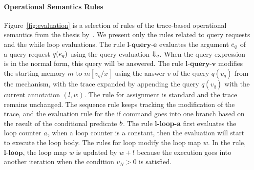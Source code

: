 \paragraph*{Operational Semantics Rules}
Figure~\ref{fig:evaluation} is a selection of rules of the trace-based operational semantics from {the thesis by~\cite{weihao22}}.
We present only the rules related to query requests and the while loop evaluations.
The rule $\textbf{l-query-e}$ evaluates the argument $e_q$ of a query request $q(e_q)$ using the query evaluation $\Downarrow_q$.
When the query expression is in the normal form, this query will be answered.
The rule $\textbf{l-query-v}$ modifies the starting memory $m$ to $m[v_q/x]$ using the answer $v$ of the query $q(v_q)$ from the mechanism, with the trace expanded by appending the query $q(v_q)$ with the current annotation $(l,w)$.
The rule for assignment is standard and the trace remains unchanged.
The sequence rule keeps tracking the modification of the trace, and the evaluation rule for the if command goes into one branch based on the result of the conditional predicate $b$. 
The rule \textbf{l-loop-a} first evaluates the loop counter $a$, when a loop counter is a constant, then the evaluation will start to execute the loop body.
The rules for loop modify the loop map $w$. In the rule, $\textbf{l-loop}$, the loop map $w$ is updated by $w + l$ because the execution goes into another iteration when the condition $v_N >0$ is satisfied.
% 
